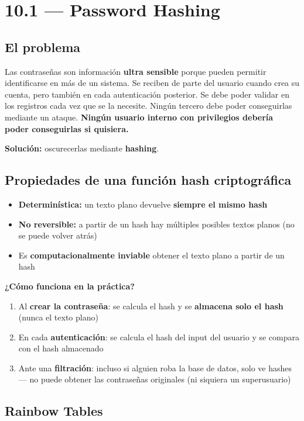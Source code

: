 \documentclass[11pt, a4paper]{article}
\begin{document}
\section{10.1 — Password Hashing}

\subsection{El problema}

Las contraseñas son información \textbf{ultra sensible} porque pueden permitir identificarse en más de un sistema. Se reciben de parte del usuario cuando crea su cuenta, pero también en cada autenticación posterior. Se debe poder validar en los registros cada vez que se la necesite. Ningún tercero debe poder conseguirlas mediante un ataque. \textbf{Ningún usuario interno con privilegios debería poder conseguirlas si quisiera.}

\textbf{Solución:} oscurecerlas mediante \textbf{hashing}.

\subsection{Propiedades de una función hash criptográfica}
\begin{itemize}
	\item \textbf{Determinística:} un texto plano devuelve \textbf{siempre el mismo hash}
	\item \textbf{No reversible:} a partir de un hash hay múltiples posibles textos planos (no se puede volver atrás)
	\item Es \textbf{computacionalmente inviable} obtener el texto plano a partir de un hash
\end{itemize}

\textbf{¿Cómo funciona en la práctica?}
\begin{enumerate}
	\item Al \textbf{crear la contraseña}: se calcula el hash y se \textbf{almacena solo el hash} (nunca el texto plano)
	\item En cada \textbf{autenticación}: se calcula el hash del input del usuario y se compara con el hash almacenado
	\item Ante una \textbf{filtración}: incluso si alguien roba la base de datos, solo ve hashes --- no puede obtener las contraseñas originales (ni siquiera un superusuario)
\end{enumerate}

\subsection{Rainbow Tables}
\end{document}
